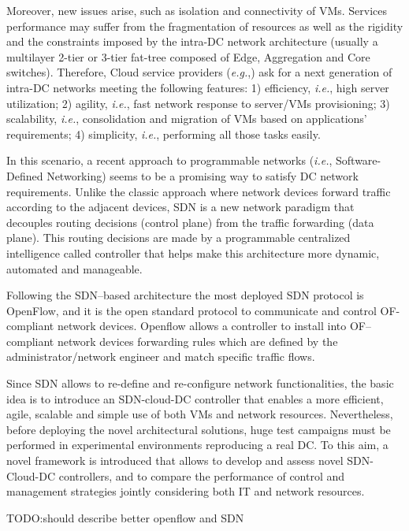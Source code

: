 \documentclass[12pt,english,oneside]{book}
\begin{document}
Moreover, new issues arise, such as isolation and connectivity of VMs.
Services performance may suffer from the fragmentation of resources as well as the rigidity and the constraints imposed by the intra-DC network architecture (usually a multilayer 2-tier or 3-tier fat-tree composed of Edge, Aggregation and Core switches\cite{dc_arch}).
Therefore, Cloud service providers (\textit{e.g.},\cite{amazon}) ask for a next generation of intra-DC networks meeting the following features: 1) efficiency, \textit{i.e.}, high server utilization; 2) agility, \textit{i.e.}, fast network response to server/VMs provisioning; 3) scalability, \textit{i.e.}, consolidation and migration of VMs based on applications' requirements; 4) simplicity, \textit{i.e.}, performing all those tasks easily\cite{baldonado}.

In this scenario, a recent approach to programmable networks (\textit{i.e.}, Software-Defined Networking) seems to be a promising way to satisfy DC network requirements\cite{ibmnec}. 
Unlike the classic approach where network devices forward traffic according to the adjacent devices, SDN is a new network paradigm that decouples routing decisions (control plane) from the traffic forwarding (data plane). This routing decisions are made by a programmable centralized intelligence called controller that helps make this architecture more dynamic, automated and manageable.

Following the SDN--based architecture the most deployed SDN protocol is OpenFlow\cite{openflow}\cite{onf}, and it is the open standard protocol to communicate and control OF-compliant network devices.
Openflow allows a controller to install into OF--compliant network devices forwarding rules which are defined by the administrator/network engineer and match specific traffic flows.

Since SDN allows to re-define and re-configure network functionalities, the basic idea is to introduce an SDN-cloud-DC controller that enables a more efficient, agile, scalable and simple use of both VMs and network resources.
Nevertheless, before deploying the novel architectural solutions, huge test campaigns must be performed in experimental environments reproducing a real DC.
To this aim, a novel framework is introduced that allows to develop and assess novel SDN-Cloud-DC controllers, and to compare the performance of control and management strategies jointly considering both IT and network resources\cite{im2013}.

TODO:should describe better openflow and SDN
\end{document}
